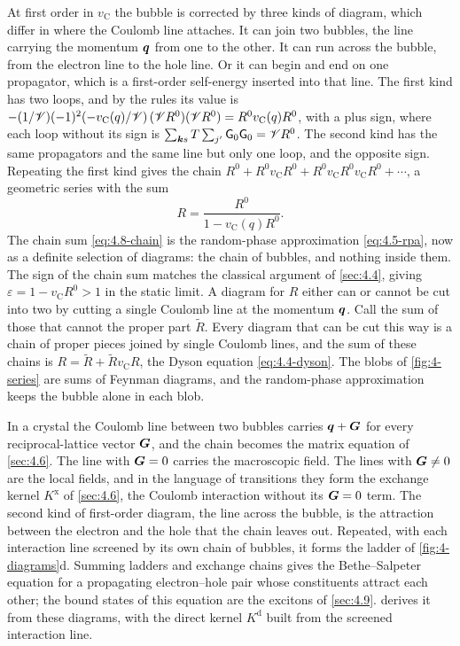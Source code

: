 At first order in $v_{\mathrm{C}}$ the bubble is corrected by three kinds of diagram, which differ in where the Coulomb line attaches. It can join two bubbles, the line carrying the momentum $\bm{q}$ from one to the other. It can run across the bubble, from the electron line to the hole line. Or it can begin and end on one propagator, which is a first-order self-energy inserted into that line. The first kind has two loops, and by the rules its value is $-(1/\mathscr{V})(-1)^2(-v_{\mathrm{C}}(q)/\mathscr{V})\,(\mathscr{V} R^0)(\mathscr{V} R^0) = R^0v_{\mathrm{C}}(q)R^0$, with a plus sign, where each loop without its sign is $\sum_{\bm{k}s}T\sum_{j'}\mathsf{G}_0\mathsf{G}_0 = \mathscr{V} R^0$. The second kind has the same propagators and the same line but only one loop, and the opposite sign. Repeating the first kind gives the chain $R^0 + R^0v_{\mathrm{C}}R^0 + R^0v_{\mathrm{C}}R^0v_{\mathrm{C}}R^0 + \cdots$, a geometric series with the sum
\begin{equation}
  R = \frac{R^0}{1 - v_{\mathrm{C}}(q)R^0} .
  \label{eq:4.8-chain}
\end{equation}
The chain sum \cref{eq:4.8-chain} is the random-phase approximation \cref{eq:4.5-rpa}, now as a definite selection of diagrams: the chain of bubbles, and nothing inside them. The sign of the chain sum matches the classical argument of \cref{sec:4.4}, giving $\varepsilon = 1 - v_{\mathrm{C}}R^0 > 1$ in the static limit. A diagram for $R$ either can or cannot be cut into two by cutting a single Coulomb line at the momentum $\bm{q}$. Call the sum of those that cannot the proper part $\tilde R$. Every diagram that can be cut this way is a chain of proper pieces joined by single Coulomb lines, and the sum of these chains is $R = \tilde R + \tilde Rv_{\mathrm{C}}R$, the Dyson equation \cref{eq:4.4-dyson}. The blobs of \cref{fig:4-series} are sums of Feynman diagrams, and the random-phase approximation keeps the bubble alone in each blob.

In a crystal the Coulomb line between two bubbles carries $\bm{q} + \bm{G}$ for every reciprocal-lattice vector $\bm{G}$, and the chain becomes the matrix equation of \cref{sec:4.6}. The line with $\bm{G} = 0$ carries the macroscopic field. The lines with $\bm{G} \ne 0$ are the local fields, and in the language of transitions they form the exchange kernel $K^{\mathrm{x}}$ of \cref{sec:4.6}, the Coulomb interaction without its $\bm{G} = 0$ term. The second kind of first-order diagram, the line across the bubble, is the attraction between the electron and the hole that the chain leaves out. Repeated, with each interaction line screened by its own chain of bubbles, it forms the ladder of \cref{fig:4-diagrams}d. Summing ladders and exchange chains gives the Bethe--Salpeter equation for a propagating electron--hole pair whose constituents attract each other; the bound states of this equation are the excitons of \cref{sec:4.9}.  derives it from these diagrams, with the direct kernel $K^{\mathrm{d}}$ built from the screened interaction line.

